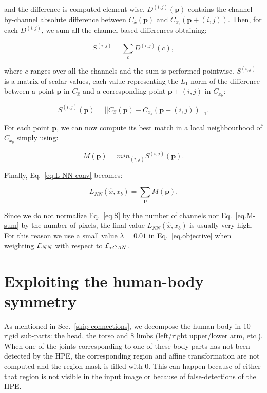 \documentclass[10pt,twocolumn,letterpaper]{article}
\begin{document}
\noindent
and the difference is computed element-wise. $D^{(i, j)} (\mathbf{p})$ contains the channel-by-channel  absolute difference between 
 $C_{\hat{x}} (\mathbf{p})$ and $C_{x_b}(\mathbf{p} + (i, j))$.
 Then, for each $D^{(i, j)}$, we sum all the channel-based differences obtaining:  

\begin{equation} 
\label{eq.S}
 S^{(i, j)} = \sum_c D^{(i, j)}(c),
\end{equation} 

\noindent 
 where $c$ ranges over all the channels and the sum is performed  
pointwise. 
$S^{(i, j)}$ is a matrix of scalar values, each value representing the $L_1$ norm of the difference between a point $\mathbf{p}$ in $C_{\hat{x}}$ and a corresponding point $\mathbf{p} + (i, j)$ in  $C_{x_b}$:

\begin{equation}
S^{(i, j)}(\mathbf{p}) = ||C_{\hat{x}} (\mathbf{p}) - C_{x_b}(\mathbf{p} + (i, j)) ||_1.
\end{equation}


For each point $\mathbf{p}$, we can now compute its best match in a local neighbourhood of  $C_{x_b}$ simply using:

\begin{equation}
\label{eq.M}
M(\mathbf{p}) =   min_{(i, j)} S^{(i, j)}(\mathbf{p}).
\end{equation}

Finally,
Eq.~\ref{eq.L-NN-conv} becomes:


\begin{equation}
\label{eq.M-sum}
L_{NN}(\hat{x},x_b) =   \sum_{\mathbf{p}} M(\mathbf{p}).
\end{equation}

Since we do not normalize  Eq.~\ref{eq.S} by the number of  channels nor   Eq.~\ref{eq.M-sum} by the number of pixels,
the final value $L_{NN}(\hat{x},x_b)$  is usually very high. For this reason we use a small value $\lambda = 0.01$ in Eq.~\ref{eq.objective} when weighting ${\cal L}_{NN}$ with respect to ${\cal L}_{cGAN}$.


\section{Exploiting the human-body symmetry}
\label{symmetry}

As mentioned in Sec.~\ref{skip-connections}, we decompose the human body in 10 rigid sub-parts: the head, the torso and 8 limbs (left/right upper/lower arm, etc.). When one of the joints corresponding to one of these body-parts has not been detected by the HPE, the corresponding region and affine transformation are not computed and  the region-mask is filled with 0. This can happen because of either that region is not visible in the input image or because of false-detections of the HPE. 
\end{document}

